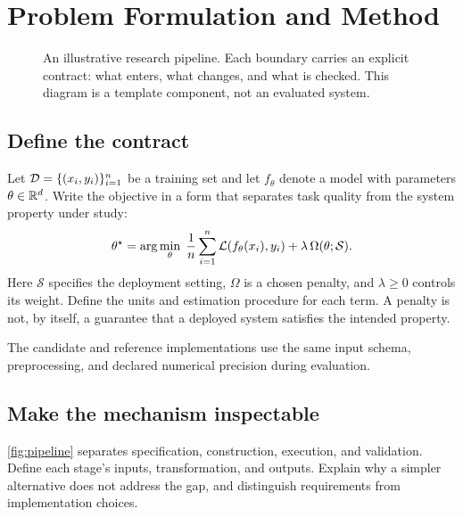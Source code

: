 \newpage
\section{Problem Formulation and Method}
\label{sec:method}
\begin{figure}[htbp]
  \centering
  
  \caption{An illustrative research pipeline. Each boundary carries an
  explicit contract: what enters, what changes, and what is checked.
  This diagram is a template component, not an evaluated system.}
  \label{fig:pipeline}
\end{figure}

\subsection{Define the contract}
Let $\mathcal{D}=\{(x_i,y_i)\}_{i=1}^{n}$ be a training set and let
$f_\theta$ denote a model with parameters $\theta\in\mathbb{R}^d$.
Write the objective in a form that separates task quality from the
system property under study:
\begin{equation}
  \theta^{\star}=\arg\min_{\theta}\;
  \frac{1}{n}\sum_{i=1}^{n}\mathcal{L}(f_\theta(x_i),y_i)
  +\lambda\,\Omega(\theta;\mathcal{S}).
  \label{eq:objective}
\end{equation}
Here $\mathcal{S}$ specifies the deployment setting, $\Omega$ is a chosen
penalty, and $\lambda\geq 0$ controls its weight. Define the units and
estimation procedure for each term. A penalty is not, by itself, a guarantee
that a deployed system satisfies the intended property.

\begin{assumption}
\label{ass:interface}
The candidate and reference implementations use the same input schema,
preprocessing, and declared numerical precision during evaluation.
\end{assumption}

\subsection{Make the mechanism inspectable}
\autoref{fig:pipeline} separates specification, construction, execution,
and validation. Define each stage's inputs, transformation, and outputs.
Explain why a simpler alternative does not address the gap, and distinguish
requirements from implementation choices.

